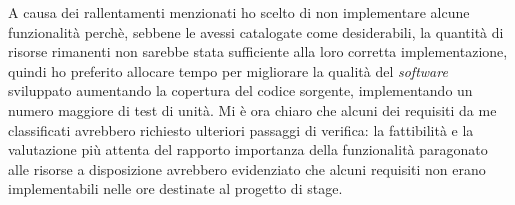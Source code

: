 A causa dei rallentamenti menzionati ho scelto di non implementare alcune funzionalità perchè, sebbene le avessi catalogate come desiderabili, la quantità di risorse rimanenti non sarebbe stata sufficiente alla loro corretta implementazione, quindi ho preferito allocare tempo per migliorare la qualità del \emph{software} sviluppato aumentando la copertura del codice sorgente, implementando un numero maggiore di test di unità. Mi è ora chiaro che alcuni dei requisiti da me classificati avrebbero richiesto ulteriori passaggi di verifica: la fattibilità e la valutazione più attenta del rapporto importanza della funzionalità paragonato alle risorse a disposizione avrebbero evidenziato che alcuni requisiti non erano implementabili nelle ore destinate al progetto di stage.
